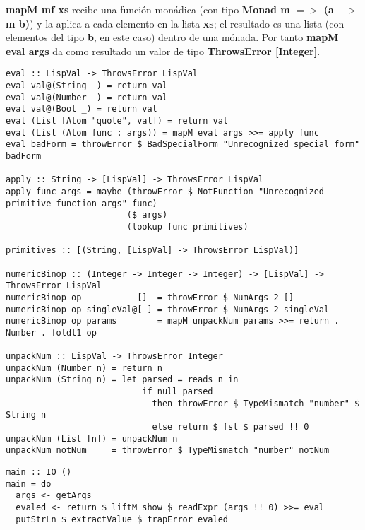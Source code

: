 \textbf{mapM mf xs} recibe una funci\'on mon\'adica (con tipo \textbf{Monad m $=\!>$ (a $-\!>$ m b)}) y la aplica a cada elemento en la lista \textbf{xs}; el resultado es una lista (con elementos del tipo \textbf{b}, en este caso) dentro de una m\'onada. Por tanto \textbf{mapM eval args} da como resultado un valor de tipo \textbf{ThrowsError [Integer]}.\\

\begin{minipage}{\linewidth}
\begin{tiny}
\begin{lstlisting}[frame=single]
eval :: LispVal -> ThrowsError LispVal
eval val@(String _) = return val
eval val@(Number _) = return val
eval val@(Bool _) = return val
eval (List [Atom "quote", val]) = return val
eval (List (Atom func : args)) = mapM eval args >>= apply func
eval badForm = throwError $ BadSpecialForm "Unrecognized special form" badForm

apply :: String -> [LispVal] -> ThrowsError LispVal
apply func args = maybe (throwError $ NotFunction "Unrecognized primitive function args" func)
                        ($ args)
                        (lookup func primitives)

primitives :: [(String, [LispVal] -> ThrowsError LispVal)]

numericBinop :: (Integer -> Integer -> Integer) -> [LispVal] -> ThrowsError LispVal
numericBinop op           []  = throwError $ NumArgs 2 []
numericBinop op singleVal@[_] = throwError $ NumArgs 2 singleVal
numericBinop op params        = mapM unpackNum params >>= return . Number . foldl1 op

unpackNum :: LispVal -> ThrowsError Integer
unpackNum (Number n) = return n
unpackNum (String n) = let parsed = reads n in 
                           if null parsed 
                             then throwError $ TypeMismatch "number" $ String n
                             else return $ fst $ parsed !! 0
unpackNum (List [n]) = unpackNum n
unpackNum notNum     = throwError $ TypeMismatch "number" notNum
\end{lstlisting}
\end{tiny}
\end{minipage}

\begin{minipage}{\linewidth}
\begin{footnotesize}
\begin{lstlisting}[frame=single]
main :: IO ()
main = do
  args <- getArgs
  evaled <- return $ liftM show $ readExpr (args !! 0) >>= eval
  putStrLn $ extractValue $ trapError evaled
\end{lstlisting}
\end{footnotesize}
\end{minipage}


